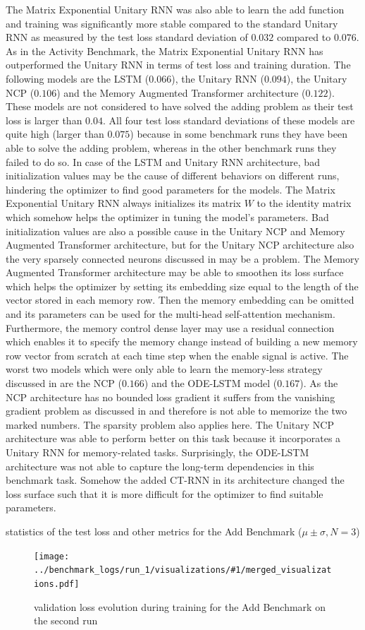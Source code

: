\documentclass[draft,final]{vutinfth} %
\newcommand{\benchmarksummary}[2]{
    \begin{table}
        \centering{}
        \resizebox{\linewidth}{!}{\csvautotabular[options]{../benchmark_logs/statistics/#1.csv}}
        \caption{statistics of the test loss and other metrics for the #2 Benchmark ($\mu \pm \sigma, N=3$)}
        \label{tab:test_loss_#1}
    \end{table}
    \begin{figure}[h]
        \centering{}
        \texttt{[image: ../benchmark\_logs/run\_1/visualizations/\#1/merged\_visualizations.pdf]}
        \caption{validation loss evolution during training for the #2 Benchmark on the second run}
        \label{fig:validation_loss_#1}
    \end{figure}
    \clearpage{}
}
\begin{document}
    The Matrix Exponential Unitary RNN was also able to learn the add function and training was significantly more stable compared to the standard Unitary RNN as measured by the test loss standard deviation of $0.032$ compared to $0.076$.
    As in the Activity Benchmark, the Matrix Exponential Unitary RNN has outperformed the Unitary RNN in terms of test loss and training duration.
    The following models are the LSTM ($0.066$), the Unitary RNN ($0.094$), the Unitary NCP ($0.106$) and the Memory Augmented Transformer architecture ($0.122$).
    These models are not considered to have solved the adding problem as their test loss is larger than $0.04$. 
    All four test loss standard deviations of these models are quite high (larger than $0.075$) because in some benchmark runs they have been able to solve the adding problem, whereas in the other benchmark runs they failed to do so.
    In case of the LSTM and Unitary RNN architecture, bad initialization values may be the cause of different behaviors on different runs, hindering the optimizer to find good parameters for the models.
    The Matrix Exponential Unitary RNN always initializes its matrix $W$ to the identity matrix which somehow helps the optimizer in tuning the model's parameters.
    Bad initialization values are also a possible cause in the Unitary NCP and Memory Augmented Transformer architecture, but for the Unitary NCP architecture also the very sparsely connected neurons discussed in  may be a problem.
    The Memory Augmented Transformer architecture may be able to smoothen its loss surface which helps the optimizer by setting its embedding size equal to the length of the vector stored in each memory row.
    Then the memory embedding can be omitted and its parameters can be used for the multi-head self-attention mechanism.
    Furthermore, the memory control dense layer may use a residual connection which enables it to specify the memory change instead of building a new memory row vector from scratch at each time step when the enable signal is active.
    The worst two models which were only able to learn the memory-less strategy discussed in  are the NCP ($0.166$) and the ODE-LSTM model ($0.167$).
    As the NCP architecture has no bounded loss gradient it suffers from the vanishing gradient problem as discussed in \cite[p. 2]{NCP} and therefore is not able to memorize the two marked numbers.
    The sparsity problem also applies here.
    The Unitary NCP architecture was able to perform better on this task because it incorporates a Unitary RNN for memory-related tasks.
    Surprisingly, the ODE-LSTM architecture was not able to capture the long-term dependencies in this benchmark task.
    Somehow the added CT-RNN in its architecture changed the loss surface such that it is more difficult for the optimizer to find suitable parameters.
    \benchmarksummary{add}{Add}
\end{document}
